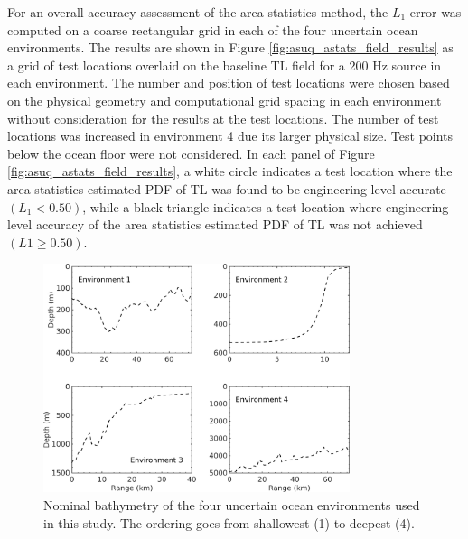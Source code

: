 For an overall accuracy assessment of the area statistics method, the
$L_1$ error was computed on a coarse rectangular grid in each of the
four uncertain ocean environments. The results are shown in Figure
\ref{fig:asuq_astats_field_results} as a grid of test locations
overlaid on the baseline \ac{TL} field for a 200 Hz source in each
environment. The number and position of test locations were chosen
based on the physical geometry and computational grid spacing in each
environment without consideration for the results at the test
locations. The number of test locations was increased in environment 4
due its larger physical size. Test points below the ocean floor were
not considered. In each panel of Figure
\ref{fig:asuq_astats_field_results}, a white circle indicates a test
location where the area-statistics estimated \ac{PDF} of \ac{TL} was found to be
engineering-level accurate $(L_1 < 0.50)$, while a black triangle
indicates a test location where engineering-level accuracy of the
area statistics estimated \ac{PDF} of \ac{TL} was not achieved $(L1 ≥ 0.50)$.

\begin{figure}[htb]
  \centering
  \includegraphics[width=0.8\textwidth]{./figs/asuq_figs/1}
  \caption[Bathymetry of the test ocean environments]{Nominal
    bathymetry of the four uncertain ocean environments used in this
    study. The ordering goes from shallowest (1) to deepest (4).}
  \label{fig:asuq_astats_bathy}
\end{figure}

